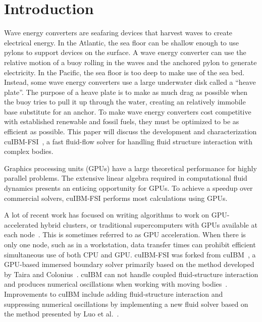 \documentclass[preprint,12pt]{elsarticle}
\begin{document}

\section{Introduction}
Wave energy converters are seafaring devices that harvest waves to create electrical energy.
In the Atlantic, the sea floor can be shallow enough to use pylons to support devices on the surface.
A wave energy converter can use the relative motion of a buoy rolling in the waves and the anchored pylon to generate electricity.
In the Pacific, the sea floor is too deep to make use of the sea bed.
Instead, some wave energy converters use a large underwater disk called a ``heave plate''.
The purpose of a heave plate is to make as much drag as possible when the buoy tries to pull it up through the water, creating an relatively immobile base substitute for an anchor.
To make wave energy converters cost competitive with established renewable and fossil fuels, they must be optimized to be as efficient as possible.
This paper will discuss the development and characterization cuIBM-FSI~\cite{cuIBM-FSI:v0.1}, a fast fluid-flow solver for handling fluid structure interaction with complex bodies.

Graphics processing units (GPUs) have a large theoretical performance for highly parallel problems.
The extensive linear algebra required in computational fluid dynamics presents an enticing opportunity for GPUs.
To achieve a speedup over commercial solvers, cuIBM-FSI performs most calculations using GPUs.

A lot of recent work has focused on writing algorithms to work on GPU-accelerated hybrid clusters, or traditional supercomputers with GPUs available at each node~\cite{xu2014collaborating,liu2016hybrid,norouzi2016new}.
This is sometimes referred to as GPU acceleration.
When there is only one node, such as in a workstation, data transfer times can prohibit efficient simultaneous use of both CPU and GPU.
cuIBM-FSI was forked from cuIBM~\cite{layton2011cuibm}, a GPU-based immersed boundary solver primarily based on the method developed by Taira and Colonius~\cite{Taira:2007jl}.
cuIBM can not handle coupled fluid-structure interaction and produces numerical oscillations when working with moving bodies~\cite{Krishnan:2012jt}.
Improvements to cuIBM include adding fluid-structure interaction and suppressing numerical oscillations by implementing a new fluid solver based on the method presented by Luo et al.~\cite{Luo:2012gx}.
\end{document}
